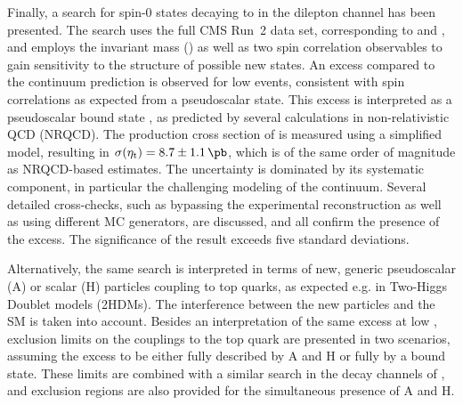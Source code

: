 
\smallskip

Finally, a search for spin-0 states decaying to \ttbar in the dilepton channel has been presented. The search uses the full CMS Run~2 data set, corresponding to \lumiRII and \sqrtsRII, and employs the invariant \ttbar mass (\mtt) as well as two \ttbar spin correlation observables to gain sensitivity to the \CP structure of possible new states. An excess compared to the \ttbar continuum prediction is observed for low \mtt events, consistent with spin correlations as expected from a pseudoscalar state. This excess is interpreted as a pseudoscalar \ttbar bound state \etat, as predicted by several calculations in non-relativistic QCD (NRQCD). The production cross section of \etat is measured using a simplified \etat model, resulting in $\sigetat = 8.7 \pm 1.1  \, \si{\pb}$, which is of the same order of magnitude as NRQCD-based estimates. The uncertainty is dominated by its systematic component, in particular the challenging modeling of the \ttbar continuum. Several detailed cross-checks, such as bypassing the experimental \ttbar reconstruction as well as using different MC generators, are discussed, and all confirm the presence of the excess. The significance of the result exceeds five standard deviations.%

Alternatively, the same search is interpreted in terms of new, generic pseudoscalar (A) or scalar (H) particles coupling to top quarks, as expected e.g. in Two-Higgs Doublet models (2HDMs). The interference between the new particles and the SM is taken into account. %
Besides an interpretation of the same excess at low \mtt, exclusion limits on the couplings to the top quark are presented in two scenarios, assuming the excess to be either fully described by A and H or fully by a \ttbar bound state. These limits are combined with a similar search in the \ljets decay channels of \ttbar, and exclusion regions are also provided for the simultaneous presence of A and H.

